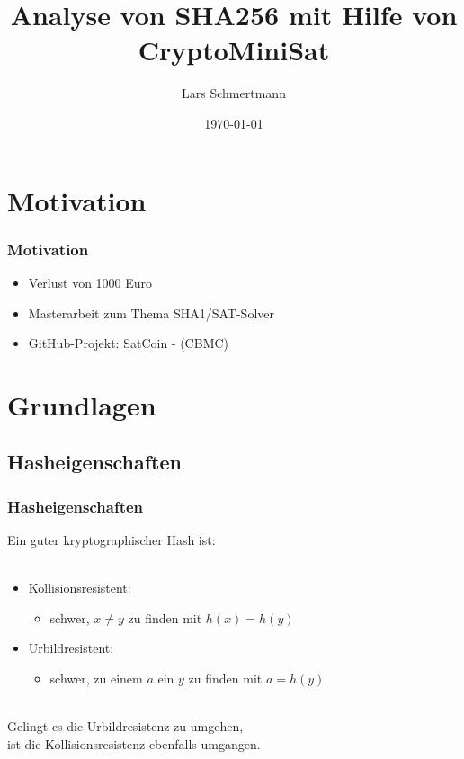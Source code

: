 \documentclass{beamer}
\title{Analyse von SHA256 mit Hilfe von CryptoMiniSat}
\author{Lars Schmertmann}
\date{\today}
\begin{document}
\maketitle


\section{Motivation}
  \begin{frame}
    \frametitle{Motivation}
    \begin{itemize}
      \setlength{\itemsep}{20pt}
      \item Verlust von 1000 Euro
      \item Masterarbeit zum Thema SHA1/SAT-Solver
      \item GitHub-Projekt: SatCoin - (CBMC)
    \end{itemize}
  \end{frame}
\section{Grundlagen}
  \subsection{Hasheigenschaften}
    \begin{frame}
      \frametitle{Hasheigenschaften}
      Ein guter kryptographischer Hash ist:\\
      ~\\
      \begin{itemize}
        \setlength{\itemsep}{20pt}
        \item Kollisionsresistent:
        \begin{itemize}
          \item schwer, $ x \neq y $ zu finden mit $ h(x) = h(y) $
        \end{itemize}
        \item Urbildresistent:
        \begin{itemize}
          \item schwer, zu einem $ a $ ein $ y $ zu finden mit $ a = h(y) $
        \end{itemize}
      \end{itemize}
      ~\\
      Gelingt es die Urbildresistenz zu umgehen,\\
      ist die Kollisionsresistenz ebenfalls umgangen.
    \end{frame}
\end{document}
